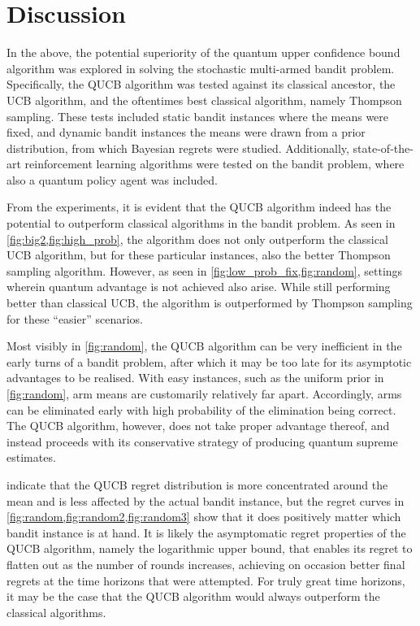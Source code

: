 \section{Discussion}
In the above, the potential superiority of the quantum upper confidence bound algorithm was explored in solving the stochastic multi-armed bandit problem.
Specifically, the QUCB algorithm was tested against its classical ancestor, the UCB algorithm, and the oftentimes best classical algorithm, namely Thompson sampling.
These tests included static bandit instances where the means were fixed, and dynamic bandit instances the means were drawn from a prior distribution, from which Bayesian regrets were studied.
Additionally, state-of-the-art reinforcement learning algorithms were tested on the bandit problem, where also a quantum policy agent was included.

From the experiments, it is evident that the QUCB algorithm indeed has the potential to outperform classical algorithms in the bandit problem.
As seen in \cref{fig:big2,fig:high_prob}, the algorithm does not only outperform the classical UCB algorithm, but for these particular instances, also the better Thompson sampling algorithm.
However, as seen in \cref{fig:low_prob_fix,fig:random}, settings wherein quantum advantage is not achieved also arise.
While still performing better than classical UCB, the algorithm is outperformed by Thompson sampling for these \enquote{easier} scenarios.

Most visibly in \cref{fig:random}, the QUCB algorithm can be very inefficient in the early turns of a bandit problem, after which it may be too late for its asymptotic advantages to be realised.
With easy instances, such as the uniform prior in \cref{fig:random}, arm means are customarily relatively far apart.
Accordingly, arms can be eliminated early with high probability of the elimination being correct.
The QUCB algorithm, however, does not take proper advantage thereof, and instead proceeds with its conservative strategy of producing quantum supreme estimates.

 indicate that the QUCB regret distribution is more concentrated around the mean and is less affected by the actual bandit instance, but the regret curves in \cref{fig:random,fig:random2,fig:random3} show that it does positively matter which bandit instance is at hand.
It is likely the asymptomatic regret properties of the QUCB algorithm, namely the logarithmic upper bound, that enables its regret to flatten out as the number of rounds increases, achieving on occasion better final regrets at the time horizons that were attempted.
For truly great time horizons, it may be the case that the QUCB algorithm would always outperform the classical algorithms.


